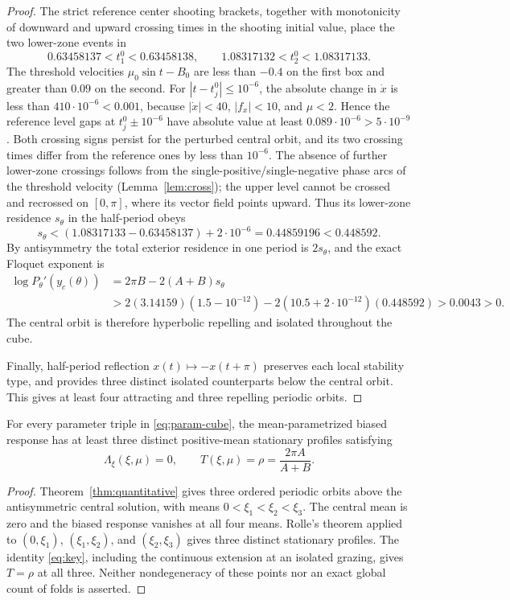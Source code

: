 \begin{proof}
The strict reference center shooting brackets,
together with monotonicity of downward and
upward crossing times in the shooting initial
value, place the two lower-zone events in
\[
 0.63458137<t_1^0<0.63458138,\qquad
 1.08317132<t_2^0<1.08317133.
\]
The threshold velocities $\mu_0\sin t-B_0$
are less than $-0.4$ on the first box and
greater than $0.09$ on the second.
For $|t-t_j^0|\le10^{-6}$, the absolute
change in $\dot x$ is less than
$410\cdot10^{-6}<0.001$, because
$|\dot x|<40$, $|f_x|<10$, and $\mu<2$.
Hence the reference level gaps at
$t_j^0\pm10^{-6}$ have absolute value
at least $0.089\cdot10^{-6}>5\cdot10^{-9}$.
Both crossing signs persist for the perturbed
central orbit, and its two crossing times
differ from the reference ones by less
than $10^{-6}$. The absence of further
lower-zone crossings follows from the
single-positive/single-negative phase arcs
of the threshold velocity (Lemma~\ref{lem:cross});
the upper level cannot be crossed and
recrossed on $[0,\pi]$, where its vector field
points upward. Thus its lower-zone residence
$s_\theta$ in the half-period obeys
\[
 s_\theta<(1.08317133-0.63458137)+2\cdot10^{-6}
 =0.44859196<0.448592.
\]
By antisymmetry the total exterior residence
in one period is $2s_\theta$, and the exact
Floquet exponent is
\begin{align*}
 \log P_\theta'(y_c(\theta))
 &=2\pi B-2(A+B)s_\theta\\
 &>2(3.14159)(1.5-10^{-12})
     -2(10.5+2\cdot10^{-12})(0.448592)
 >0.0043>0.
\end{align*}
The central orbit is therefore hyperbolic
repelling and isolated throughout the cube.

Finally, half-period reflection
$x(t)\mapsto-x(t+\pi)$ preserves each local
stability type, and provides three distinct
isolated counterparts below the central
orbit. This gives at least four attracting
and three repelling periodic orbits.
\end{proof}

\begin{corollary}
\label{cor:critical}
For every parameter triple in \eqref{eq:param-cube},
the mean-parametrized biased response has at least
three distinct positive-mean stationary profiles
satisfying
\[
   \Lambda_\xi(\xi,\mu)=0,\qquad
   T(\xi,\mu)=\rho=\frac{2\pi A}{A+B}.
\]
\end{corollary}
\begin{proof}
Theorem~\ref{thm:quantitative} gives three ordered
periodic orbits above the antisymmetric central
solution, with means $0<\xi_1<\xi_2<\xi_3$.
The central mean is zero and the biased
response vanishes at all four means.
Rolle's theorem applied to $(0,\xi_1)$,
$(\xi_1,\xi_2)$, and $(\xi_2,\xi_3)$
gives three distinct stationary profiles.
The identity \eqref{eq:key}, including the
continuous extension at an isolated grazing,
gives $T=\rho$ at all three.
Neither nondegeneracy of these points nor
an exact global count of folds is asserted.
\end{proof}

